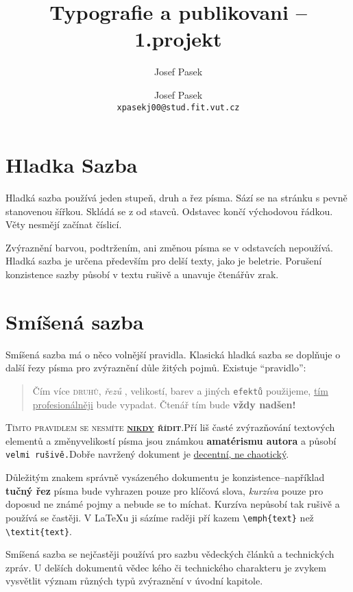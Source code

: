 \documentclass[twocolumn, 10pt, a4paper]{article}
\title{Typografie a publikovani -- 1.projekt}
\author{Josef Pasek}
\author{Josef Pasek \\ \texttt{xpasekj00@stud.fit.vut.cz}}
\begin{document}
\maketitle
\section{Hladka Sazba}
Hladká sazba používá jeden stupeň, druh a řez písma. Sází
se na stránku s pevně stanovenou šířkou. Skládá se z od\-
stavců. Odstavec končí východovou řádkou. Věty nesmějí
začínat číslicí.

Zvýraznění barvou, podtržením, ani změnou písma se
v odstavcích nepoužívá. Hladká sazba je určena především
pro delší texty, jako je beletrie. Porušení konzistence sazby
působí v textu rušivě a unavuje čtenářův zrak.
\section{Smíšená sazba}
 Smíšená sazba má o něco volnější pravidla. Klasická hladká
sazba se doplňuje o další řezy písma pro zvýraznění důle\-
žitých pojmů. Existuje \enquote{pravidlo}:
\begin{quotation}
    Čím více \textsc{druhů}, \textit{řezů }, {\tiny velikostí}, \textcolor[rgb]{0, 1, 0.098}{barev}
    a jiných \texttt{efektů} použijeme, \uline{tím profesionálněji}
bude {\selectfont{dokument} }vypadat. Čtenář tím bude {\Large \textbf{vždy
    nadšen!}}
\end{quotation}
\textsc{Tímto pravidlem se nesmíte \textbf{\uline{nikdy} řídit}}.Pří\-
liš časté zvýrazňování textových elementů a změny{\tiny velikostí}
písma jsou známkou \textbf{amatérismu autora} a působí \texttt{velmi
rušivě.}Dobře navržený dokument je
\uline{decentní, ne chaotický}.

Důležitým znakem správně vysázeného dokumentu je
konzistence--například \textbf{tučný řez} písma bude vyhrazen
pouze pro klíčová slova, \textit{kurzíva} pouze pro doposud ne\-
známé pojmy a nebude se to míchat. Kurzíva nepůsobí tak
rušivě a používá se častěji. V \LaTeX u ji sázíme raději pří\-
kazem \verb|\emph{text}| než \verb|\textit{text}|.

Smíšená sazba se nejčastěji používá pro sazbu vědeckých
článků a technických zpráv. U delších dokumentů vědec\-
kého či technického charakteru je zvykem vysvětlit význam
různých typů zvýraznění v úvodní kapitole.
\end{document}
